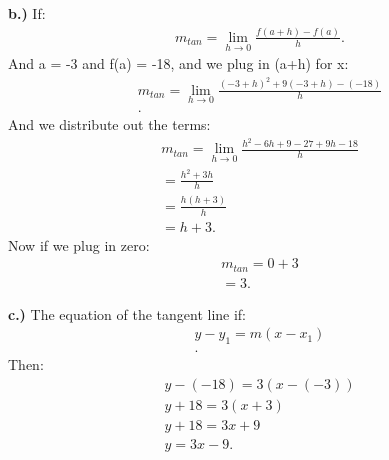 \documentclass{report}
\begin{document}
    \bigbreak \noindent \bigbreak \noindent 
    \textbf{b.)} 
    \bigbreak \noindent 
    \noindent If:
    \begin{align*}
        m_{tan} = \lim\limits_{h \to 0}{ \frac{f(a + h) - f(a)}{h}}
    .\end{align*}
    \bigbreak \noindent And a = -3 and f(a) = -18, and we plug in (a+h) for x:
    \begin{align*}
        m_{tan} = \lim\limits_{h \to 0}{ \frac{ \left(-3 + h\right)^2 + 9 \left(-3 + h\right) - \left(-18\right)}{h}} \\ 
    .\end{align*}
    \bigbreak \noindent 
    And we distribute out the terms:
    \begin{align*}
        m_{tan} = \lim\limits_{h \to 0}{ \frac{h^2-6h+9-27+9h-18}{h}} \\
        = \frac{ h^2 + 3h}{h} \\ 
        = \frac{h \left(h+3\right)}{h} \\ 
        = h + 3
    .\end{align*}
    \bigbreak \noindent 
    Now if we plug in zero: 
    \begin{align*}
        m_{tan} = 0 + 3 \\
        = 3
    .\end{align*}

    \bigbreak \noindent \bigbreak \noindent 
    \textbf{c.)} 
    The equation of the tangent line if:
    \begin{align*}
        y - y_1 = m \left(x - x_1\right) \\ 
    .\end{align*}
    \bigbreak \noindent 
    Then:
    \begin{align*}
         y - \left(-18\right) = 3 \left(x - \left(-3\right)\right) \\
         y + 18 = 3 \left(x+3\right) \\ 
         y + 18 = 3x + 9 \\ 
         y = 3x - 9
    .\end{align*}
\end{document}
